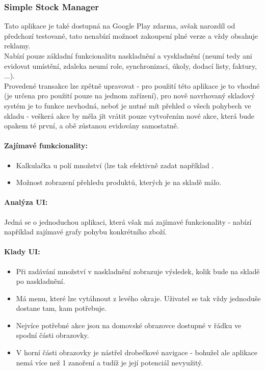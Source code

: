 
\subsubsection{Simple Stock Manager}

Tato aplikace je také dostupná na Google Play zdarma, avšak narozdíl od předchozí testované, tato nenabízí možnost zakoupení plné verze a vždy obsahuje reklamy.\\
Nabízí pouze základní funkcionalitu naskladnění a vyskladnění (neumí tedy ani evidovat umístění, zdaleka neumí role, synchronizaci, úkoly, dodací listy, faktury, ...).\\
Provedené transakce lze zpětně upravovat - pro použití této aplikace je to vhodné (je určena pro použití pouze na jednom zařízení), pro nově navrhovaný skladový systém je to funkce nevhodná, neboť je nutné mít přehled o všech pohybech ve skladu - veškerá akce by měla jít vrátit pouze vytvořením nové akce, která bude opakem té první, a obě zůstanou evidovány samostatně.

\paragraph{Zajímavé funkcionality:}
\begin{itemize}
	\item Kalkulačka u polí množství (lze tak efektivně zadat například .
	\item Možnost zobrazení přehledu produktů, kterých je na skladě málo.
\end{itemize}

\paragraph{Analýza UI:} Jedná se o jednoduchou aplikaci, která však má zajímavé funkcionality - nabízí například zajímavé grafy pohybu konkrétního zboží.

\paragraph{Klady UI:}
\begin{itemize}
	\item Při zadávání množství v naskladnění zobrazuje výsledek, kolik bude na skladě po naskladnění.
	\item Má menu, které lze vytáhnout z levého okraje. Uživatel se tak vždy jednoduše dostane tam, kam potřebuje.
	\item Nejvíce potřebné akce jsou na domovské obrazovce dostupné v řádku ve spodní části obrazovky.
	\item V horní části obrazovky je nástřel drobečkové navigace - bohužel ale aplikace nemá více než 1 zanoření a tudíž je její potenciál nevyužitý.
\end{itemize}

